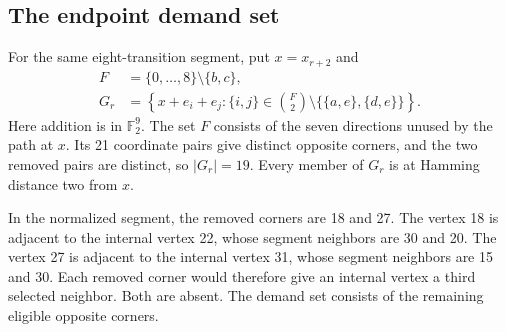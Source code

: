 \documentclass[11pt,a4paper]{article}
\theoremstyle{definition}
\theoremstyle{remark}
\begin{document}
\subsection{The endpoint demand set}
For the same eight-transition segment, put $x=x_{r+2}$ and
\[
\begin{aligned}
F&=\{0,\ldots,8\}\setminus\{b,c\},\\
G_r&=\left\{x+e_i+e_j:
\{i,j\}\in\binom F2\setminus\bigl\{\{a,e\},\{d,e\}\bigr\}\right\}.
\end{aligned}
\]
Here addition is in $\mathbb F_2^9$. The set $F$ consists of the seven directions unused by the path at $x$. Its 21 coordinate pairs give distinct opposite corners, and the two removed pairs are distinct, so $|G_r|=19$. Every member of $G_r$ is at Hamming distance two from $x$.

In the normalized segment, the removed corners are 18 and 27. The vertex 18 is adjacent to the internal vertex 22, whose segment neighbors are 30 and 20. The vertex 27 is adjacent to the internal vertex 31, whose segment neighbors are 15 and 30. Each removed corner would therefore give an internal vertex a third selected neighbor. Both are absent. The demand set consists of the remaining eligible opposite corners.
\end{document}
